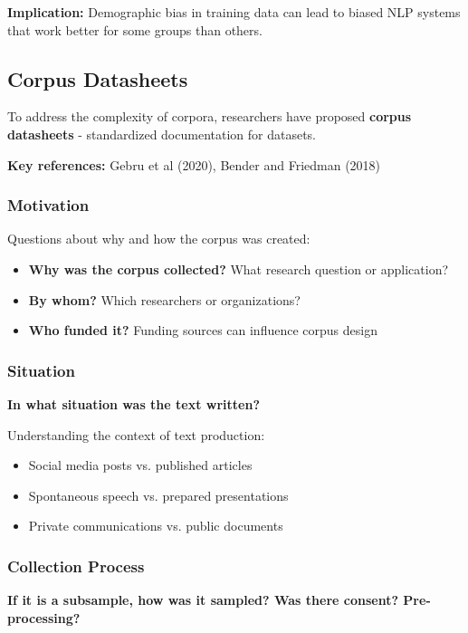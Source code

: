 \documentclass[11pt,a4paper]{article}
\theoremstyle{definition}
\theoremstyle{plain}
\theoremstyle{remark}
\begin{document}
\textbf{Implication:} Demographic bias in training data can lead to biased NLP systems that work better for some groups than others.

\subsection{Corpus Datasheets}

To address the complexity of corpora, researchers have proposed \textbf{corpus datasheets} - standardized documentation for datasets.

\textbf{Key references:} Gebru et al (2020), Bender and Friedman (2018)

\subsubsection{Motivation}

Questions about why and how the corpus was created:
\begin{itemize}
    \item \textbf{Why was the corpus collected?} What research question or application?
    \item \textbf{By whom?} Which researchers or organizations?
    \item \textbf{Who funded it?} Funding sources can influence corpus design
\end{itemize}

\subsubsection{Situation}

\textbf{In what situation was the text written?}

Understanding the context of text production:
\begin{itemize}
    \item Social media posts vs. published articles
    \item Spontaneous speech vs. prepared presentations
    \item Private communications vs. public documents
\end{itemize}

\subsubsection{Collection Process}

\textbf{If it is a subsample, how was it sampled? Was there consent? Pre-processing?}
\end{document}

